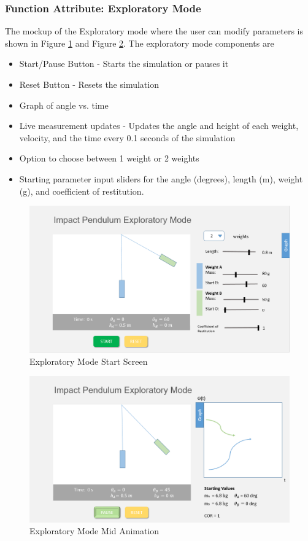 \documentclass[onecolumn, draftclsnofoot,10pt, compsoc]{IEEEtran}
\begin{document}
\subsubsection{Function Attribute: Exploratory Mode}
The mockup of the Exploratory mode where the user can modify parameters is shown in Figure \ref{fig:explore_start} and Figure \ref{fig:explore_mid}. 
The exploratory mode components are
\begin{itemize}
  \item Start/Pause Button - Starts the simulation or pauses it 
    \item Reset Button - Resets the simulation
    \item Graph of angle vs. time 
    \item Live measurement updates  - Updates the angle and height of each weight, velocity, and the time every 0.1 seconds of the simulation
    \item Option to choose between 1 weight or 2 weights
    \item Starting parameter input sliders for the angle (degrees), length (m), weight (g), and coefficient of restitution.
\end{itemize}
\begin{figure}[H]
  \includegraphics[width=\textwidth]{new_explore_s.png}
  \caption{Exploratory Mode Start Screen}
  \label{fig:explore_start}
\end{figure}
\begin{figure}[H]
  \includegraphics[width=\textwidth]{new_explore_mid.png}
  \caption{Exploratory Mode Mid Animation}
  \label{fig:explore_mid}
\end{figure}
\end{document}
